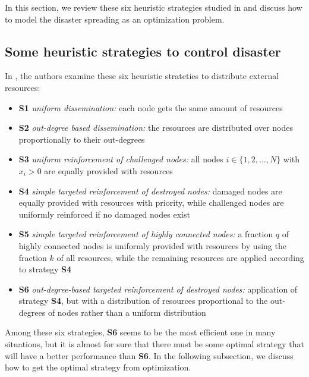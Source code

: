 In this section, we review these six heuristic strategies studied in \cite{buzna2007efficient} and discuss how to model the disaster spreading as an optimization problem.

\subsection{Some heuristic strategies to control disaster}
In \cite{buzna2007efficient}, the authors examine these six heuristic strateties to distribute external resources:

\begin{itemize}[label={}]
	\item \textbf{S1} \quad \emph{uniform dissemination:} each node gets the same amount of resources
	\item \textbf{S2} \quad \emph{out-degree based dissemination:} the resources are distributed over nodes proportionally to their out-degrees
	\item \textbf{S3} \quad \emph{uniform reinforcement of challenged nodes:} all nodes $i\in\{1,2,\ldots, N\}$ with $x_i >0 $ are equally provided with resources
	\item \textbf{S4} \quad \emph{simple targeted reinforcement of destroyed nodes:} damaged nodes are equally provided with resources with priority, while challenged nodes are uniformly reinforced if no damaged nodes exist
	\item \textbf{S5} \quad \emph{simple targeted reinforcement of highly connected nodes: } a fraction $q$ of highly connected nodes is uniformly provided with resources by using the fraction $k$ of all resources, while the remaining resources are applied according to strategy \textbf{S4}
	\item \textbf{S6} \quad \emph{out-degree-based targeted reinforcement of destroyed nodes:} application of strategy \textbf{S4}, but with a distribution of resources proportional to the out-degrees of nodes rather than a uniform distribution
\end{itemize}
%

Among these six strategies, \textbf{S6} seems to be the most efficient one in many situations\cite{buzna2007efficient}, but it is almost for sure that there must be some optimal strategy that will have a better performance than \textbf{S6}. In the following subsection, we discuss how to get the optimal strategy from optimization.

